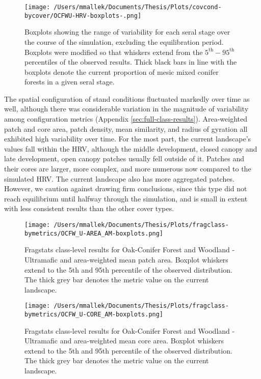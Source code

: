 \begin{figure}[!htbp]
  \centering
    \texttt{[image: /Users/mmallek/Documents/Thesis/Plots/covcond-bycover/OCFWU-HRV-boxplots-.png]}
  \caption{Boxplots showing the range of variability for each seral stage over the course of the simulation, excluding the equilibration period. Boxplots were modified so that whiskers extend from the $5^{\text{th}} - 95^{\text{th}}$ percentiles of the observed results. Thick black bars in line with the boxplots denote the current proportion of mesic mixed conifer forests in a given seral stage.} 
  \label{fig:covcond_ocfwu_boxplots}
\end{figure}

The spatial configuration of stand conditions fluctuated markedly over time as well, although there was considerable variation in the magnitude of variability among configuration metrics (Appendix \ref{sec:full-class-results}). Area-weighted patch and core area, patch density, mean similarity, and radius of gyration all exhibited high variability over time. For the most part, the current landscape's values fall within the HRV, although the middle development, closed canopy and late development, open canopy patches usually fell outside of it. Patches and their cores are larger, more complex, and more numerous now compared to the simulated HRV. The current landscape also has more aggregated patches. However, we caution against drawing firm conclusions, since this type did not reach equilibrium until halfway through the simulation, and is small in extent with less consistent results than the other cover types.

\begin{figure}[!htbp]
\centering
    \texttt{[image: /Users/mmallek/Documents/Thesis/Plots/fragclass-bymetrics/OCFW\_U-AREA\_AM-boxplots.png]}
  \caption{Fragstats class-level results for Oak-Conifer Forest and Woodland - Ultramafic and area-weighted mean patch area. Boxplot whiskers extend to the 5th and 95th percentile of the observed distribution. The thick grey bar denotes the metric value on the current landscape.}
  \label{fig:ocfwu_areaam}
\end{figure}


\begin{figure}[!htbp]
\centering
    \texttt{[image: /Users/mmallek/Documents/Thesis/Plots/fragclass-bymetrics/OCFW\_U-CORE\_AM-boxplots.png]}
  \caption{Fragstats class-level results for Oak-Conifer Forest and Woodland - Ultramafic and area-weighted mean core area. Boxplot whiskers extend to the 5th and 95th percentile of the observed distribution. The thick grey bar denotes the metric value on the current landscape.}
  \label{fig:ocfwu_coream}
\end{figure}


